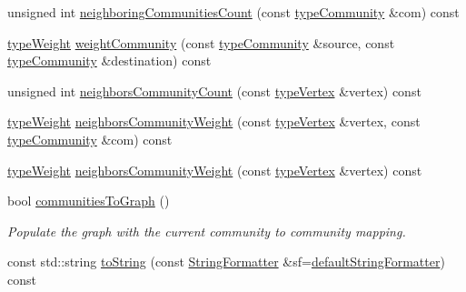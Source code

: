 \begin{DoxyCompactItemize}
\item 
unsigned int \hyperlink{classGraphUndirectedGroupable_a6f6c8b41ca143f9d2ef7e0f267da6b9e}{neighboring\+Communities\+Count} (const \hyperlink{graphUndirectedGroupable_8h_a914da95c9ea7f14f4b7f875c36818556}{type\+Community} \&com) const
\item 
\hyperlink{edge_8h_a2e7ea3be891ac8b52f749ec73fee6dd2}{type\+Weight} \hyperlink{classGraphUndirectedGroupable_a2884361f00176ac8f16afca6feb3e404}{weight\+Community} (const \hyperlink{graphUndirectedGroupable_8h_a914da95c9ea7f14f4b7f875c36818556}{type\+Community} \&source, const \hyperlink{graphUndirectedGroupable_8h_a914da95c9ea7f14f4b7f875c36818556}{type\+Community} \&destination) const
\item 
unsigned int \hyperlink{classGraphUndirectedGroupable_ae5d9459c76d6104345547eaa3e79a088}{neighbors\+Community\+Count} (const \hyperlink{edge_8h_a5fbd20c46956d479cb10afc9855223f6}{type\+Vertex} \&vertex) const
\item 
\hyperlink{edge_8h_a2e7ea3be891ac8b52f749ec73fee6dd2}{type\+Weight} \hyperlink{classGraphUndirectedGroupable_a24c1e8303eefff2635f7462d3cf1c6cf}{neighbors\+Community\+Weight} (const \hyperlink{edge_8h_a5fbd20c46956d479cb10afc9855223f6}{type\+Vertex} \&vertex, const \hyperlink{graphUndirectedGroupable_8h_a914da95c9ea7f14f4b7f875c36818556}{type\+Community} \&com) const
\item 
\hyperlink{edge_8h_a2e7ea3be891ac8b52f749ec73fee6dd2}{type\+Weight} \hyperlink{classGraphUndirectedGroupable_ae11062420fb89f450762eb3456b18f8f}{neighbors\+Community\+Weight} (const \hyperlink{edge_8h_a5fbd20c46956d479cb10afc9855223f6}{type\+Vertex} \&vertex) const
\item 
bool \hyperlink{classGraphUndirectedGroupable_af6fc2c9e8aad7c6bce37d30eeaf184a8}{communities\+To\+Graph} ()
\begin{DoxyCompactList}\small\item\em Populate the graph with the current community to community mapping. \end{DoxyCompactList}\item 
const std\+::string \hyperlink{classGraphUndirectedGroupable_a615f30036acfdd33e45b82dc47e7d174}{to\+String} (const \hyperlink{classStringFormatter}{String\+Formatter} \&sf=\hyperlink{stringFormatter_8h_abf1349c8e24162d0134072aff288f2a2}{default\+String\+Formatter}) const
\end{DoxyCompactItemize}
